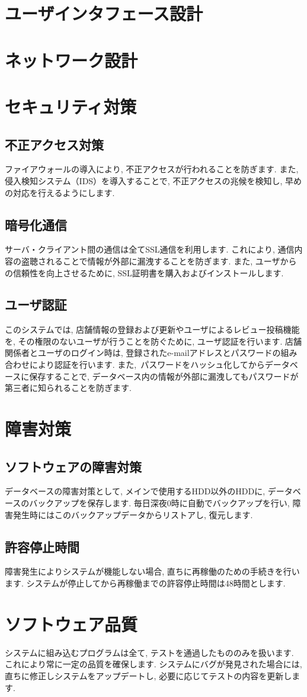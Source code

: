 \documentclass[a4j,titlepage]{jarticle}
\begin{document}
\section{ユーザインタフェース設計}

\section{ネットワーク設計}

\section{セキュリティ対策}
\subsection{不正アクセス対策}
ファイアウォールの導入により, 不正アクセスが行われることを防ぎます.
また, 侵入検知システム（IDS）を導入することで,
不正アクセスの兆候を検知し, 早めの対応を行えるようにします.
\subsection{暗号化通信}
サーバ・クライアント間の通信は全てSSL通信を利用します.
これにより, 通信内容の盗聴されることで情報が外部に漏洩することを防ぎます.
また, ユーザからの信頼性を向上させるために, SSL証明書を購入およびインストールします.
\subsection{ユーザ認証}
このシステムでは, 店舗情報の登録および更新やユーザによるレビュー投稿機能を,
その権限のないユーザが行うことを防ぐために, ユーザ認証を行います.
店舗関係者とユーザのログイン時は, 登録されたe-mailアドレスとパスワードの組み合わせにより認証を行います.
また,~パスワードをハッシュ化してからデータベースに保存することで,
データベース内の情報が外部に漏洩してもパスワードが第三者に知られることを防ぎます.


\section{障害対策}
\subsection{ソフトウェアの障害対策}
データベースの障害対策として, メインで使用するHDD以外のHDDに,
データベースのバックアップを保存します.
毎日深夜0時に自動でバックアップを行い,
障害発生時にはこのバックアップデータからリストアし, 復元します.
\subsection{許容停止時間}
障害発生によりシステムが機能しない場合,
直ちに再稼働のための手続きを行います.
システムが停止してから再稼働までの許容停止時間は48時間とします.

\section{ソフトウェア品質}
システムに組み込むプログラムは全て, テストを通過したもののみを扱います.
これにより常に一定の品質を確保します.
システムにバグが発見された場合には, 直ちに修正しシステムをアップデートし,
必要に応じてテストの内容を更新します.
\end{document}
